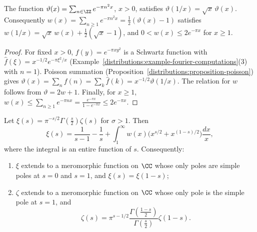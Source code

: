\begin{lemma}\label{analytic-number-theory:lemma-theta}
The function $\vartheta(x) = \sum_{n \in \ZZ}e^{-\pi n^2x}$, $x > 0$, satisfies $\vartheta(1/x) = \sqrt{x}\,\vartheta(x)$. Consequently $w(x) = \sum_{n \geq 1}e^{-\pi n^2x} = \frac12(\vartheta(x) - 1)$
satisfies $w(1/x) = \sqrt{x}\,w(x) + \frac12(\sqrt{x} - 1)$, and $0 < w(x) \leq 2e^{-\pi x}$ for $x \geq 1$.
\end{lemma}

\begin{proof}
For fixed $x > 0$, $f(y) = e^{-\pi xy^2}$ is a Schwartz function with $\hat f(\xi) = x^{-1/2}e^{-\pi\xi^2/x}$ (Example~\ref{distributions:example-fourier-computations}(3) with $n = 1$). Poisson summation
(Proposition~\ref{distributions:proposition-poisson}) gives $\vartheta(x) = \sum_nf(n) = \sum_k\hat f(k) = x^{-1/2}\vartheta(1/x)$. The relation for $w$ follows from $\vartheta = 2w + 1$. Finally, for
$x \geq 1$, $w(x) \leq \sum_{n \geq 1}e^{-\pi nx} = \frac{e^{-\pi x}}{1 - e^{-\pi x}} \leq 2e^{-\pi x}$.
\end{proof}

\begin{theorem}\label{analytic-number-theory:theorem-functional-equation}
Let $\xi(s) = \pi^{-s/2}\Gamma(\frac s2)\zeta(s)$ for $\sigma > 1$. Then
\begin{equation}\label{analytic-number-theory:equation-xi}
\xi(s) = \frac{1}{s - 1} - \frac1s + \int_1^\infty w(x)\bigl(x^{s/2} + x^{(1-s)/2}\bigr)\frac{dx}{x},
\end{equation}
where the integral is an entire function of $s$. Consequently:
\begin{enumerate}
\item $\xi$ extends to a meromorphic function on $\CC$ whose only poles are simple poles at $s = 0$ and $s = 1$, and $\xi(s) = \xi(1 - s)$;
\item $\zeta$ extends to a meromorphic function on $\CC$ whose only pole is the simple pole at $s = 1$, and
\[
\zeta(s) = \pi^{s - 1/2}\frac{\Gamma(\frac{1 - s}{2})}{\Gamma(\frac s2)}\zeta(1 - s).
\]
\end{enumerate}
\end{theorem}

